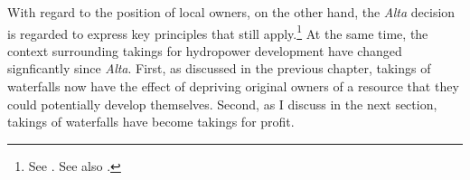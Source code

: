 With regard to the position of local owners, on the other hand, the {\it Alta} decision is regarded to express key principles that still apply.\footnote{See \cite{jorpeland11}. See also \cite[312]{haagensen02}.} %
At the same time, the context surrounding takings for hydropower development have changed signficantly since {\it Alta}. First, as discussed in the previous chapter, takings of waterfalls now have the effect of depriving original owners of a resource that they could potentially develop themselves. Second, as I discuss in the next section, takings of waterfalls have become takings for profit.


